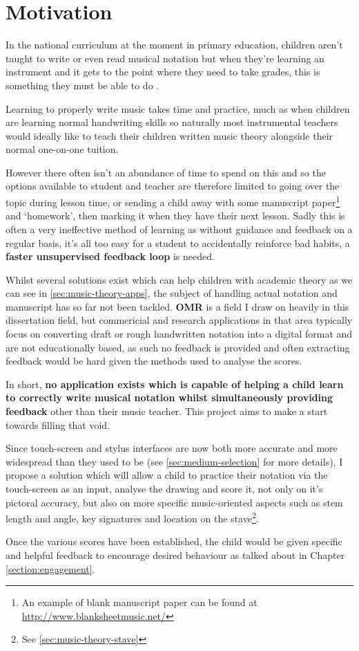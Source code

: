 \section{Motivation}

In the national curriculum at the moment in primary education, children aren't taught to write or even read musical notation \parencite{Attai5} but when they're learning an instrument and it gets to the point where they need to take grades, this is something they must be able to do \parencite{whyMusicTheory}.

Learning to properly write music takes time and practice, much as when children are learning normal handwriting skills so naturally most instrumental teachers would ideally like to teach their children written music theory alongside their normal one-on-one tuition.

However there often isn't an abundance of time to spend on this and so the options available to student and teacher are therefore limited to going over the topic during lesson time, or sending a child away with some manuscript paper\footnote{An example of blank manuscript paper can be found at \url{http://www.blanksheetmusic.net/}} and `homework', then marking it when they have their next lesson. Sadly this is often a very ineffective method of learning as without guidance and feedback on a regular basis, it's all too easy for a student to accidentally reinforce bad habits, a \textbf{faster unsupervised feedback loop} is needed.

Whilst several solutions exist which can help children with academic theory as we can see in \cref{sec:music-theory-apps}, the subject of handling actual notation and manuscript has so far not been tackled. \textbf{\acrfull{OMR}} is a field I draw on heavily in this dissertation field, but commericial and research applications in that area typically focus on converting draft or rough handwritten notation into a digital format and are not educationally based, as such no feedback is provided and often extracting feedback would be hard given the methods used to analyse the scores.

In short, \textbf{no application exists which is capable of helping a child learn to correctly write musical notation whilst simultaneously providing feedback} other than their music teacher. This project aims to make a start towards filling that void.

Since touch-screen and stylus interfaces are now both more accurate and more widespread than they used to be (see \cref{sec:medium-selection} for more details), I propose a solution which will allow a child to practice their notation via the touch-screen as an input, analyse the drawing and score it, not only on it's pictoral accuracy, but also on more specific music-oriented aspects such as stem length and angle, key signatures and location on the stave\footnote{See \cref{sec:music-theory-stave}}.

Once the various scores have been established, the child would be given specific and helpful feedback to encourage desired behaviour as talked about in Chapter \cref{section:engagement}.
